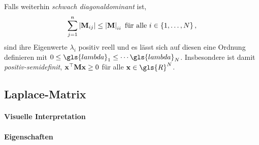 Falls  weiterhin \emph{schwach diagonaldominant} ist, \dhe{}
\begin{equation}
  \sum_{j=1}^n \left|\mathbf{M}_{ij}\right| \leq \left|\mathbf{M}\right|_{ii}\text{ für alle }i \in \left\{1, \ldots, N\right\},
\end{equation}
sind ihre Eigenwerte $\lambda_i$ positiv reell und es lässt sich auf diesen eine Ordnung definieren mit $0 \leq \gls{lambda}_1 \leq \cdots \gls{lambda}_N$.
Insbesondere ist  damit \emph{positiv-semidefinit}, \dhe{} $\mathbf{x}^{\top}\mathbf{M}\mathbf{x} \geq 0$ für alle $\ve{x} \in \gls{R}^{N}$.

\subsection{Laplace-Matrix}
\label{laplace_matrix}

\paragraph{Visuelle Interpretation}
\label{laplace_interpretation}

\paragraph{Eigenschaften}
\label{laplace_eigenschaften}

